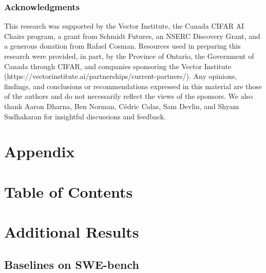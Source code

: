 \documentclass{article} %
\begin{document}
\subsubsection*{Acknowledgments}
This research was supported by the Vector Institute, the Canada CIFAR AI Chairs program, a grant from Schmidt Futures, an NSERC Discovery Grant, and a generous donation from Rafael Cosman. Resources used in preparing this research were provided, in part, by the Province of Ontario, the Government of Canada through CIFAR, and companies sponsoring the Vector Institute (https://vectorinstitute.ai/partnerships/current-partners/). Any opinions, findings, and conclusions or recommendations expressed in this material are those of the authors and do not necessarily reflect the views of the sponsors. We also thank Aaron Dharna, Ben Norman, Cédric Colas, Sam Devlin, and Shyam Sudhakaran for insightful discussions and feedback.




\clearpage
\appendix


\section*{\LARGE Appendix}

\section*{Table of Contents}

\startcontents[sections]

\clearpage

\section{Additional Results}
\label{app:add-results}
\subsection{Baselines on SWE-bench}
\label{app:plots-swe}
\end{document}

